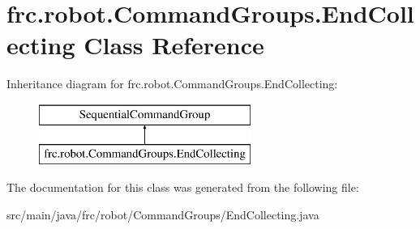 \hypertarget{classfrc_1_1robot_1_1_command_groups_1_1_end_collecting}{}\section{frc.\+robot.\+Command\+Groups.\+End\+Collecting Class Reference}
\label{classfrc_1_1robot_1_1_command_groups_1_1_end_collecting}
Inheritance diagram for frc.\+robot.\+Command\+Groups.\+End\+Collecting\+:\begin{figure}[H]
\begin{center}
\leavevmode
\includegraphics[height=2.000000cm]{classfrc_1_1robot_1_1_command_groups_1_1_end_collecting}
\end{center}
\end{figure}


The documentation for this class was generated from the following file\+:\begin{DoxyCompactItemize}
\item 
src/main/java/frc/robot/\+Command\+Groups/End\+Collecting.\+java\end{DoxyCompactItemize}
